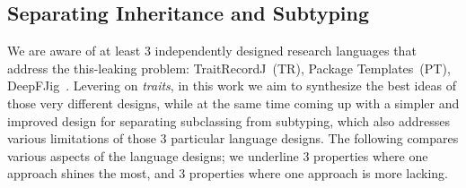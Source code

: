 \subsection{Separating Inheritance and Subtyping}
We are aware of at least 3 independently designed research languages 
that address the this-leaking problem: TraitRecordJ~(TR)\cite{Bettini:2010:ISP:1774088.1774530,BETTINI2013521,Bettini2015282}, Package Templates~(PT)\cite{KrogdahlMS09,DBLP:journals/taosd/AxelsenSKM12,DBLP:conf/gpce/AxelsenK12}, DeepFJig~\cite{deep,servetto2014meta,fjig}.
Levering on \emph{traits}, in this work we aim to synthesize
the best ideas of those very different designs, while at the same time 
coming up with a simpler and improved design for separating
subclassing from subtyping, which also addresses various limitations of those
3 particular language designs.
The following compares 
various aspects of the language designs;
we underline 3 properties where one approach shines the most, and 3 properties where one approach is more lacking.

